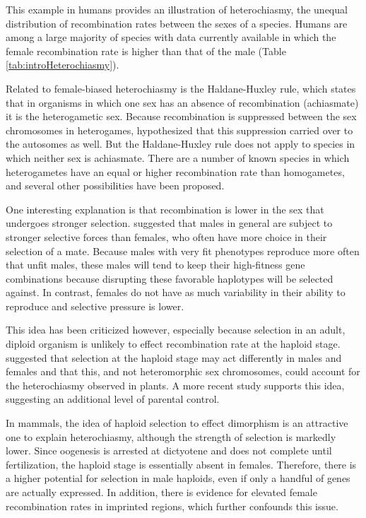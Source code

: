 This example in humans provides an illustration of heterochiasmy, the unequal distribution of recombination rates between the sexes of a species.
Humans are among a large majority of species with data currently available in which the female recombination rate is higher than that of the male (Table \ref{tab:introHeterochiasmy}).

Related to female-biased heterochiasmy is the Haldane-Huxley rule\cite{Haldane1922,Huxley1928}, which states that in organisms in which one sex has an absence of recombination (achiasmate) it is the heterogametic sex.
Because recombination is suppressed between the sex chromosomes in heterogames, \citet{Haldane1922} hypothesized that this suppression carried over to the autosomes as well.
But the Haldane-Huxley rule does not apply to species in which neither sex is achiasmate.
There are a number of known species in which heterogametes have an equal or higher recombination rate than homogametes, and several other possibilities have been proposed.

One interesting explanation is that recombination is lower in the sex that undergoes stronger selection.
\citet{Trivers1988} suggested that males in general are subject to stronger selective forces than females, who often have more choice in their selection of a mate.
Because males with very fit phenotypes reproduce more often that unfit males, these males will tend to keep their high-fitness gene combinations because disrupting these favorable haplotypes will be selected against.
In contrast, females do not have as much variability in their ability to reproduce and selective pressure is lower.

This idea has been criticized however, especially because selection in an adult, diploid organism is unlikely to effect recombination rate at the haploid stage\cite{Lenormand2003}.
\citet{Lenormand2005} suggested that selection at the haploid stage may act differently in males and females and that this, and not heteromorphic sex chromosomes, could account for the heterochiasmy observed in plants.
A more recent study\cite{Otto2015} supports this idea, suggesting an additional level of parental control.

In mammals, the idea of haploid selection to effect dimorphism is an attractive one to explain heterochiasmy, although the strength of selection is markedly lower.
Since oogenesis is arrested at dictyotene and does not complete until fertilization, the haploid stage is essentially absent in females.
Therefore, there is a higher potential for selection in male haploids, even if only a handful of genes are actually expressed\cite{Dadoune2004}.
In addition, there is evidence for elevated female recombination rates in imprinted regions\cite{Lercher2003}, which further confounds this issue.

